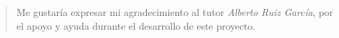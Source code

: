 
\pagestyle{empty}

 

\vspace*{\fill}
\thispagestyle{empty}
\begin{quotation}
	\em 
	\begin{flushright}
		Me gustaría expresar mi agradecimiento al tutor \textit{Alberto Ruiz García}, por el apoyo y ayuda durante el desarrollo de este proyecto.
	\end{flushright}
	\medskip
	\raggedleft
\end{quotation}
\vspace*{\fill}